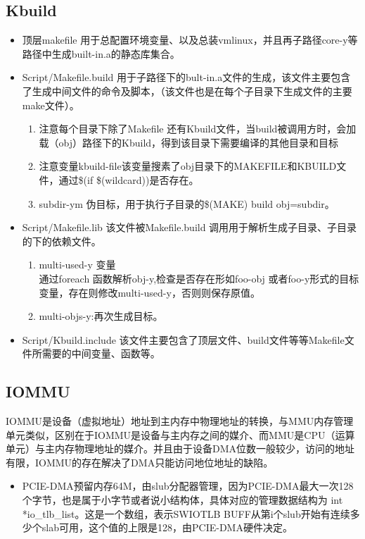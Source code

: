    \subsection{Kbuild}
    	\begin{itemize}
    		\item 顶层makefile 用于总配置环境变量、以及总装vmlinux，并且再子路径core-y等路径中生成built-in.a的静态库集合。
    		\item Script/Makefile.build 用于子路径下的bult-in.a文件的生成，该文件主要包含了生成中间文件的命令及脚本，（该文件也是在每个子目录下生成文件的主要make文件）。
    			\begin{enumerate}
    				\item 注意每个目录下除了Makefile 还有Kbuild文件，当build被调用方时，会加载（obj）路径下的Kbuild，得到该目录下需要编译的其他目录和目标
    				\item 注意变量kbuild-file该变量搜素了obj目录下的MAKEFILE和KBUILD文件，通过\$(if \$(wildcard))是否存在。
    				\item subdir-ym 伪目标，用于执行子目录的\$(MAKE) build obj=subdir。
    			\end{enumerate}
    		\item Script/Makefile.lib 该文件被Makefile.build 调用用于解析生成子目录、子目录的下的依赖文件。
    			\begin{enumerate}
    				\item multi-used-y 变量\\
    				通过foreach 函数解析obj-y,检查是否存在形如foo-obj 或者foo-y形式的目标变量，存在则修改multi-used-y，否则则保存原值。
    				\item multi-objs-y:再次生成目标。
    				
    			\end{enumerate}
    		\item Script/Kbuild.include 该文件主要包含了顶层文件、build文件等等Makefile文件所需要的中间变量、函数等。
    	\end{itemize}
    \subsection{IOMMU}
    		IOMMU是设备（虚拟地址）地址到主内存中物理地址的转换，与MMU内存管理单元类似，区别在于IOMMU是设备与主内存之间的媒介、而MMU是CPU（运算单元）与主内存物理地址的媒介。并且由于设备DMA位数一般较少，访问的地址有限，IOMMU的存在解决了DMA只能访问地位地址的缺陷。
    	\begin{itemize}
    		\item PCIE-DMA预留内存64M，由slub分配器管理，因为PCIE-DMA最大一次128个字节，也是属于小字节或者说小结构体，具体对应的管理数据结构为 int *io\_tlb\_list。这是一个数组，表示SWIOTLB BUFF从第i个slub开始有连续多少个slab可用，这个值的上限是128，由PCIE-DMA硬件决定。
    	\end{itemize}